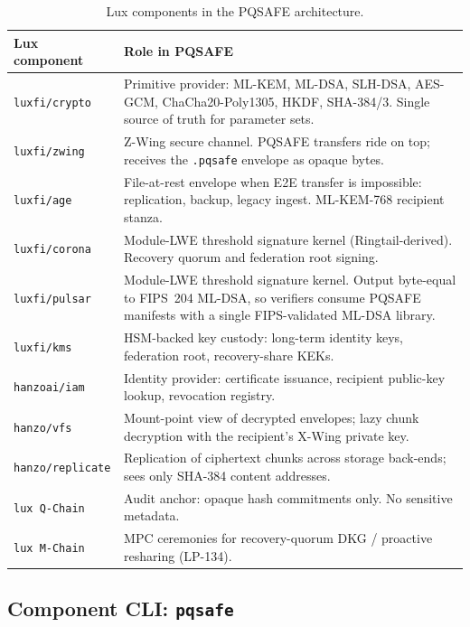 \documentclass[11pt,a4paper]{article}
\begin{document}
\begin{table}[H]
\centering
\small
\begin{tabularx}{\linewidth}{l X}
\toprule
\textbf{Lux component} & \textbf{Role in PQSAFE} \\
\midrule
\texttt{luxfi/crypto} & Primitive provider: ML-KEM, ML-DSA, SLH-DSA, AES-GCM, ChaCha20-Poly1305, HKDF, SHA-384/3. Single source of truth for parameter sets. \\
\texttt{luxfi/zwing} & Z-Wing secure channel. PQSAFE transfers ride on top; receives the \texttt{.pqsafe} envelope as opaque bytes. \\
\texttt{luxfi/age} & File-at-rest envelope when E2E transfer is impossible: replication, backup, legacy ingest. ML-KEM-768 recipient stanza. \\
\texttt{luxfi/corona} & Module-LWE threshold signature kernel (Ringtail-derived). Recovery quorum and federation root signing. \\
\texttt{luxfi/pulsar} & Module-LWE threshold signature kernel. Output byte-equal to FIPS~204 ML-DSA, so verifiers consume PQSAFE manifests with a single FIPS-validated ML-DSA library. \\
\texttt{luxfi/kms} & HSM-backed key custody: long-term identity keys, federation root, recovery-share KEKs. \\
\texttt{hanzoai/iam} & Identity provider: certificate issuance, recipient public-key lookup, revocation registry. \\
\texttt{hanzo/vfs} & Mount-point view of decrypted envelopes; lazy chunk decryption with the recipient's X-Wing private key. \\
\texttt{hanzo/replicate} & Replication of ciphertext chunks across storage back-ends; sees only SHA-384 content addresses. \\
\texttt{lux Q-Chain} & Audit anchor: opaque hash commitments only. No sensitive metadata. \\
\texttt{lux M-Chain} & MPC ceremonies for recovery-quorum DKG / proactive resharing (LP-134). \\
\bottomrule
\end{tabularx}
\caption{Lux components in the PQSAFE architecture.}
\end{table}

\subsection{Component CLI: \texttt{pqsafe}}
\end{document}
